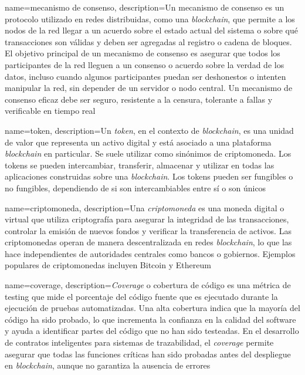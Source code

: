 {
    name=mecanismo de consenso,
    description={Un mecanismo de consenso es un protocolo utilizado en redes distribuidas, como una \textit{blockchain}, que permite a los nodos de la red llegar a un acuerdo sobre el estado actual del sistema o sobre qué transacciones son válidas y deben ser agregadas al registro o cadena de bloques. El objetivo principal de un mecanismo de consenso es asegurar que todos los participantes de la red lleguen a un consenso o acuerdo sobre la verdad de los datos, incluso cuando algunos participantes puedan ser deshonestos o intenten manipular la red, sin depender de un servidor o nodo central. Un mecanismo de consenso eficaz debe ser seguro, resistente a la censura, tolerante a fallas y verificable en tiempo real \cite{diaz2022protocolos}}
}

{
    name=token,
    description={Un \textit{token}, en el contexto de \textit{blockchain}, es una unidad de valor que representa un activo digital y está asociado a una plataforma \textit{blockchain} en particular. Se suele utilizar como sinónimos de criptomoneda. Los tokens se pueden intercambiar, transferir, almacenar y utilizar en todas las aplicaciones construidas sobre una \textit{blockchain}. Los tokens pueden ser fungibles o no fungibles, dependiendo de si son intercambiables entre sí o son únicos}
}

{
    name=criptomoneda,
    description={Una \textit{criptomoneda} es una moneda digital o virtual que utiliza criptografía para asegurar la integridad de las transacciones, controlar la emisión de nuevos fondos y verificar la transferencia de activos. Las criptomonedas operan de manera descentralizada en redes \textit{blockchain}, lo que las hace independientes de autoridades centrales como bancos o gobiernos. Ejemplos populares de criptomonedas incluyen Bitcoin y Ethereum}
}

{
    name=coverage,
    description={\textit{Coverage} o  cobertura de código es una métrica de testing que mide el porcentaje del código fuente que es ejecutado durante la ejecución de pruebas automatizadas. Una alta cobertura indica que la mayoría del código ha sido probado, lo que incrementa la confianza en la calidad del software y ayuda a identificar partes del código que no han sido testeadas. En el desarrollo de contratos inteligentes para sistemas de trazabilidad, el \textit{coverage} permite asegurar que todas las funciones críticas han sido probadas antes del despliegue en \textit{blockchain}, aunque no garantiza la ausencia de errores}
}

